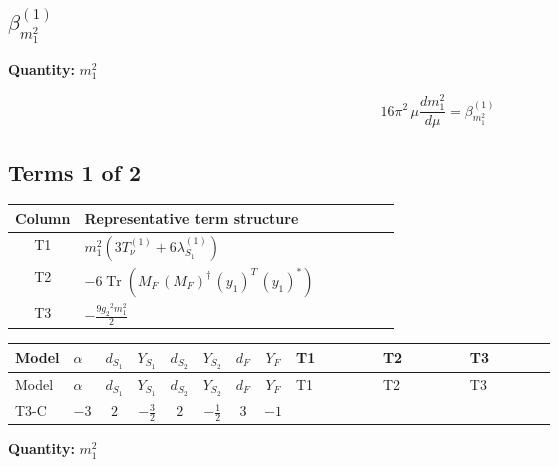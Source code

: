 \documentclass[8pt]{article}
\begin{document}
\begin{landscape}
\section*{$\beta_{m_1^2}^{(1)}$}
\noindent\textbf{Quantity: }$m_1^2$\par\smallskip
\[16\pi^2\,\mu\frac{d m_1^2}{d\mu}=\beta_{m_1^2}^{(1)}\]
\subsection*{Terms 1 of 2}
\begin{center}
\begin{tabular}{@{}c >{\raggedright\arraybackslash}p{0.82\linewidth}@{}}
\toprule
Column & Representative term structure \\
\midrule
T1 & \(\displaystyle {m_1^2} (3 T_{\nu}^{(1)}+6 {\lambda_{S_1}^{(1)}})\) \\
\midrule
T2 & \(\displaystyle -6 \operatorname{Tr}\!\left({M_F}\,\left({M_F}\right)^{\dagger}\,\left({y_1}\right)^{T}\,\left({y_1}\right)^{*}\right)\) \\
\midrule
T3 & \(\displaystyle -\frac{9 {g_2}^2 {m_1^2}}{2}\) \\
\midrule
\bottomrule
\end{tabular}
\end{center}
\smallskip
\tiny
\begin{longtable}{@{}llcccccc >{\raggedright\arraybackslash}p{0.21\linewidth} >{\raggedright\arraybackslash}p{0.21\linewidth} >{\raggedright\arraybackslash}p{0.21\linewidth}@{}}
\toprule
Model & $\alpha$ & $d_{S_1}$ & $Y_{S_1}$ & $d_{S_2}$ & $Y_{S_2}$ & $d_F$ & $Y_F$ & T1 & T2 & T3 \\
\midrule
\endfirsthead
\toprule
Model & $\alpha$ & $d_{S_1}$ & $Y_{S_1}$ & $d_{S_2}$ & $Y_{S_2}$ & $d_F$ & $Y_F$ & T1 & T2 & T3 \\
\midrule
\endhead
T3-C & $-3$ & $2$ & $-\frac{3}{2}$ & $2$ & $-\frac{1}{2}$ & $3$ & $-1$ & \scriptsize\adjustbox{max width=\linewidth}{$\begin{gathered} {m_1^2} (3 T_{\nu}^{(1)}+6 {\lambda_{S_1}^{(1)}})\end{gathered}$} & \scriptsize\adjustbox{max width=\linewidth}{$\begin{gathered} -6 \operatorname{Tr}\!\left({M_F}\,\left({M_F}\right)^{\dagger}\,\left({y_1}\right)^{T}\,\left({y_1}\right)^{*}\right)\end{gathered}$} & \scriptsize\adjustbox{max width=\linewidth}{$\begin{gathered} -\frac{9 {g_2}^2 {m_1^2}}{2}\end{gathered}$} \\
\midrule
\bottomrule
\end{longtable}
\clearpage
\noindent\textbf{Quantity: }$m_1^2$\par\smallskip

\end{landscape}
\end{document}
